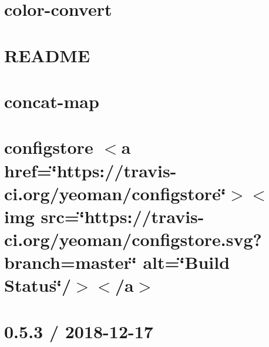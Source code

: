 \let\mypdfximage\pdfximage\def\pdfximage{\immediate\mypdfximage}\documentclass[twoside]{book}
\newcommand{\+}{\discretionary{\mbox{\scriptsize$\hookleftarrow$}}{}{}}
\begin{document}
\chapter{color-\/convert}
\label{md__c_1__git_hub__p_r_o_y_e_c_t_o-_i_i_i-_g_o_t_rest-api-node-mysql_node_modules_color-convert__r_e_a_d_m_e}

\chapter{R\+E\+A\+D\+ME}
\label{md__c_1__git_hub__p_r_o_y_e_c_t_o-_i_i_i-_g_o_t_rest-api-node-mysql_node_modules_color-name__r_e_a_d_m_e}

\chapter{concat-\/map}
\label{md__c_1__git_hub__p_r_o_y_e_c_t_o-_i_i_i-_g_o_t_rest-api-node-mysql_node_modules_concat-map__r_e_a_d_m_e}

\chapter{configstore $<$a href=\char`\"{}https\+://travis-\/ci.\+org/yeoman/configstore\char`\"{}$>$$<$img src=\char`\"{}https\+://travis-\/ci.\+org/yeoman/configstore.\+svg?branch=master\char`\"{} alt=\char`\"{}\+Build Status\char`\"{}/$>$$<$/a$>$}
\label{md__c_1__git_hub__p_r_o_y_e_c_t_o-_i_i_i-_g_o_t_rest-api-node-mysql_node_modules_configstore_readme}

\chapter{0.5.3 / 2018-\/12-\/17}
\label{md__c_1__git_hub__p_r_o_y_e_c_t_o-_i_i_i-_g_o_t_rest-api-node-mysql_node_modules_content-disposition__h_i_s_t_o_r_y}

\end{document}
